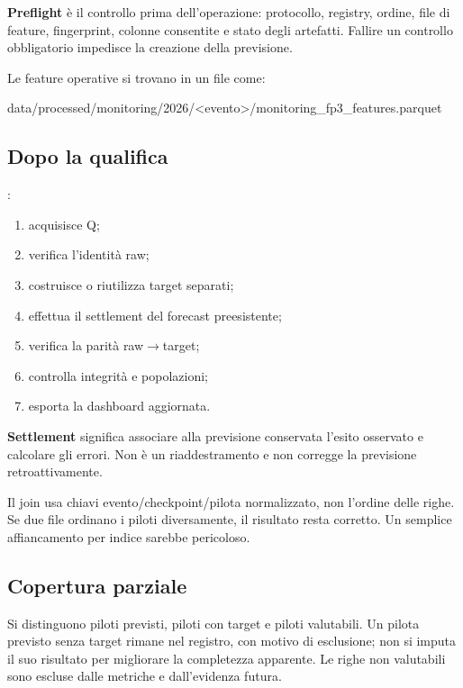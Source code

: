 \documentclass[11pt,a4paper]{article}
\providecommand{\tightlist}{\setlength{\itemsep}{0pt}\setlength{\parskip}{0pt}}
\newcommand{\code}[1]{{\ttfamily\small\seqsplit{#1}}}
\begin{document}
\textbf{Preflight} è il controllo prima dell'operazione: protocollo, registry, ordine, file di feature, fingerprint, colonne consentite e stato degli artefatti. Fallire un controllo obbligatorio impedisce la creazione della previsione.

Le feature operative si trovano in un file come:

\begin{CodeBlock}
data/processed/monitoring/2026/<evento>/monitoring_fp3_features.parquet
\end{CodeBlock}

\subsection{Dopo la qualifica}\label{dopo-la-qualifica}

\code{monitoring-after-qualifying}:

\begin{enumerate}
\def\labelenumi{\arabic{enumi}.}
\tightlist
\item
  acquisisce Q;
\item
  verifica l'identità raw;
\item
  costruisce o riutilizza target separati;
\item
  effettua il settlement del forecast preesistente;
\item
  verifica la parità raw\ensuremath{\rightarrow}target;
\item
  controlla integrità e popolazioni;
\item
  esporta la dashboard aggiornata.
\end{enumerate}

\textbf{Settlement} significa associare alla previsione conservata l'esito osservato e calcolare gli errori. Non è un riaddestramento e non corregge la previsione retroattivamente.

Il join usa chiavi evento/checkpoint/pilota normalizzato, non l'ordine delle righe. Se due file ordinano i piloti diversamente, il risultato resta corretto. Un semplice affiancamento per indice sarebbe pericoloso.

\subsection{Copertura parziale}\label{copertura-parziale}

Si distinguono piloti previsti, piloti con target e piloti valutabili. Un pilota previsto senza target rimane nel registro, con motivo di esclusione; non si imputa il suo risultato per migliorare la completezza apparente. Le righe non valutabili sono escluse dalle metriche e dall'evidenza futura.
\end{document}
